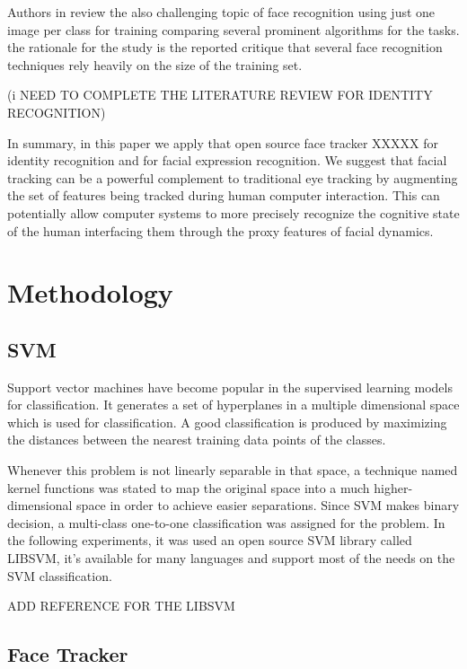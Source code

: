 \documentclass[]{article}
\begin{document}
Authors in \cite{Tan20061725} review the also challenging topic of face recognition using  just one image per
class for training comparing several prominent algorithms for the tasks. the rationale for the study is the reported
critique that several face recognition techniques rely heavily on the size of the training set.

(i NEED TO COMPLETE THE LITERATURE REVIEW FOR IDENTITY RECOGNITION)

In summary, in this paper we apply that open source face tracker XXXXX for identity recognition and for facial
expression recognition. We suggest that facial tracking can be a powerful complement to traditional eye tracking  by
augmenting the set of features being tracked during human computer interaction. This  can potentially allow computer
systems to more precisely recognize the cognitive state of the human interfacing them through the proxy features of facial
dynamics.


\section{Methodology}

\subsection{SVM}

Support vector machines have become popular in the supervised learning models
for classification. It generates a set of hyperplanes in a multiple dimensional
space which is used for classification.  A good classification is produced by
maximizing the distances between the nearest training data points of the classes.

Whenever this problem is not linearly separable in that space, a technique named
kernel functions was stated to map the original space into a much
higher-dimensional space in order to achieve easier separations. Since SVM makes
binary decision, a multi-class one-to-one classification was assigned for the problem.
In the following experiments, it was used an open source SVM library called
LIBSVM, it's available for many languages and support most of the needs on the
SVM classification.

ADD REFERENCE FOR THE LIBSVM



\subsection{Face Tracker}
\end{document}
